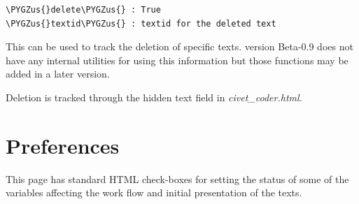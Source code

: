 \documentclass[letterpaper,10pt,english]{sphinxmanual}
\def\PYGZus{\char`\_}
\begin{document}
\begin{Verbatim}[commandchars=\\\{\}]
\PYGZus{}delete\PYGZus{} : True
\PYGZus{}textid\PYGZus{} : textid for the deleted text
\end{Verbatim}

This can be used to track the deletion of specific texts. version
Beta-0.9 does not have any internal utilities for using this
information but those functions may be added in a later version.

Deletion is tracked through the hidden text field 
in \emph{civet\_coder.html.}


\chapter{Preferences}
\label{preferences::doc}\label{preferences:preferences}
This page has standard HTML check-boxes for setting the status of some of the
variables affecting the work flow and initial presentation of the texts.
\end{document}
